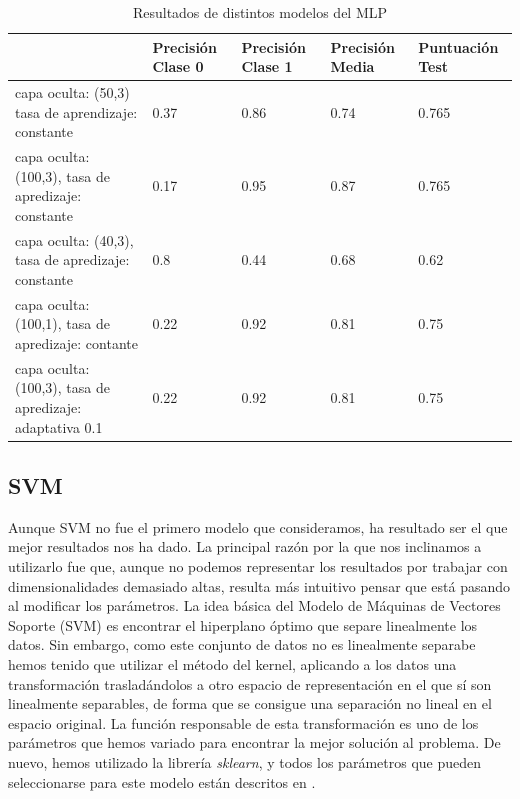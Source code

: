 \documentclass[journal,twoside]{JoPhA}
\begin{document}
\begin{table}[htb!]
	\begin{center}
		\caption{Resultados de distintos modelos del MLP}
		\begin{tabular}{| m{2.1cm} | m{1cm} | m{1cm} | m{1cm} | m{1.2cm} |}
			\hline
			& Precisión Clase 0 & Precisión Clase 1 & Precisión Media & Puntuación Test   \\ \hline
			capa oculta: (50,3) tasa de aprendizaje: constante & 0.37                & 0.86                & 0.74              & 0.765  \\ \hline
			capa oculta: (100,3), tasa de apredizaje: constante & 0.17                & 0.95               & 0.87             & 0.765  \\ \hline
			capa oculta: (40,3), tasa de apredizaje: constante & 0.8 & 0.44 & 0.68 & 0.62 \\ \hline
			capa oculta: (100,1), tasa de apredizaje: contante & 0.22 & 0.92 & 0.81 & 0.75	\\ \hline
			capa oculta: (100,3), tasa de apredizaje: adaptativa 0.1 & 0.22 & 0.92 & 0.81 & 0.75 \\ \hline
			
		\end{tabular}
		
		\label{tabla:tabla_mlp}
	\end{center}
\end{table}


\subsection{SVM}
	
	Aunque SVM no fue el primero modelo que consideramos, ha resultado ser el que mejor resultados nos ha dado. La principal razón por la que nos inclinamos a utilizarlo fue que, aunque no podemos representar los resultados por trabajar con dimensionalidades demasiado altas, resulta más intuitivo pensar que está pasando al modificar los parámetros. La idea básica del Modelo de Máquinas de Vectores Soporte (SVM) es encontrar el hiperplano óptimo que separe linealmente los datos. Sin embargo, como este conjunto de datos no es linealmente separabe hemos tenido que utilizar el método del kernel, aplicando a los datos una transformación trasladándolos a otro espacio de representación en el que sí son linealmente separables, de forma que se consigue una separación no lineal en el espacio original. La función responsable de esta transformación es uno de los parámetros que hemos variado para encontrar la mejor solución al problema. De nuevo, hemos utilizado la librería \textit{sklearn}, y todos los parámetros que pueden seleccionarse para este modelo están descritos en \cite{svm}. \\
	
\end{document}

